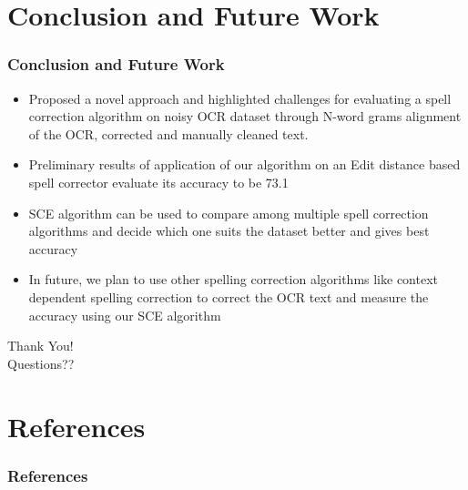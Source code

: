 \documentclass{beamer}
\begin{document}
\section{Conclusion and Future Work}
\begin{frame}
\frametitle{Conclusion and Future Work}
\begin{itemize}
 \justifying

\item
Proposed a novel approach and highlighted challenges for evaluating a spell correction algorithm on noisy OCR dataset through N-word grams alignment of the OCR, corrected and manually cleaned text.

\item
Preliminary results of application of our algorithm on an Edit distance based spell corrector evaluate its accuracy to be 73.1%

\item
SCE algorithm can be used to compare among multiple spell correction algorithms and decide which one suits the dataset better and gives best accuracy

\item
In future, we plan to use other spelling correction algorithms like context dependent spelling correction to correct the OCR text and
measure the accuracy using our SCE algorithm


\end{itemize}
\end{frame}


\begin{frame}

\begin{center}
 
\Huge Thank You!\\ \vspace{0.2in}
Questions??
\end{center}

\end{frame}

\section*{References}
\begin{frame}

\frametitle{References}

\scriptsize{}


\end{frame}
\end{document}
